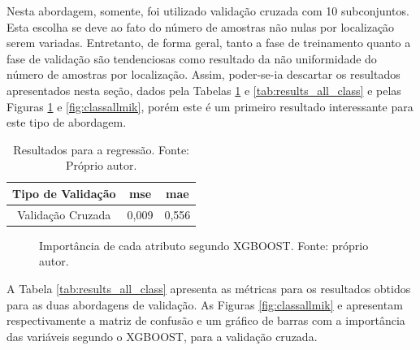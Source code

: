 Nesta abordagem, somente, foi utilizado validação cruzada com 10 subconjuntos. Esta escolha se deve ao fato do número de amostras não nulas por localização serem variadas. Entretanto, de forma geral, tanto a fase de treinamento quanto a fase de validação são tendenciosas como resultado da não uniformidade do número de amostras por localização. Assim, poder-se-ia descartar os resultados apresentados nesta seção, dados pela Tabelas \ref{tab:results_all_reg} e \ref{tab:results_all_class}  e pelas Figuras \ref{fig:regall} e \ref{fig:classallmik}, porém este é um primeiro resultado interessante para este tipo de abordagem.

\begin{table}[H]
\begin{center}
\begin{tabular}{|c|c|c|}
\hline
Tipo de Validação & mse       & mae   \\ \hline
Validação Cruzada                   & 0,009   & 0,556  \\ \hline
\end{tabular}
\end{center}
\vspace{12pt}
\caption{Resultados para a regressão. Fonte: Próprio autor.}
\label{tab:results_all_reg}
\end{table}

\begin{figure}[H]
\center
{}
\caption{Importância de cada atributo segundo XGBOOST. Fonte: próprio autor.}\label{fig:regall}
\end{figure}

A Tabela \ref{tab:results_all_class} apresenta as métricas para os resultados obtidos para as duas abordagens de validação. As Figuras \ref{fig:classallmik} e apresentam respectivamente a matriz de confusão e um gráfico de barras com a importância das variáveis segundo o XGBOOST, para a validação cruzada.

